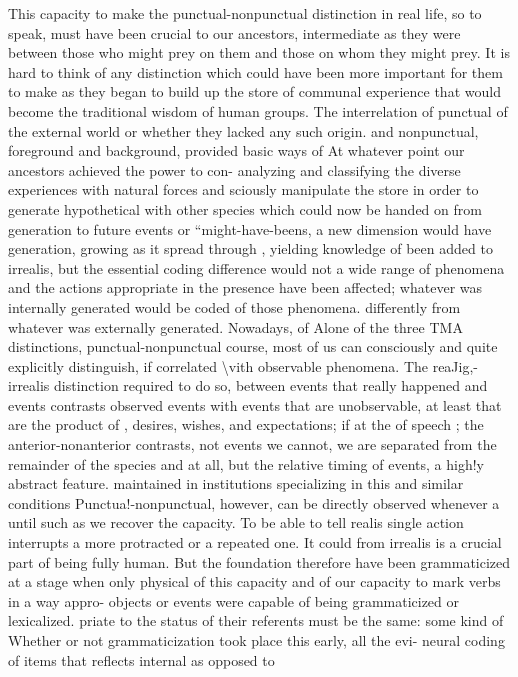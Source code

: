 This capacity to make the punctual-nonpunctual distinction in real life, so to speak, must have been crucial to our ancestors, inter\-mediate as they were between those who might prey on them and those on whom they might prey. It is hard to think of any distinction
which could have been more important for them to make as they began to build up the store of communal experience that would become
the traditional wisdom of human groups. The interrelation of punctual of the external world or whether they lacked any such origin.
and nonpunctual, foreground and background, provided basic ways of At whatever point our ancestors achieved the power to con- analyzing and classifying the diverse experiences with natural forces and sciously manipulate the  store in order to generate hypothetical with other species which could now be handed on from generation to future events or ``might-have-beens, a new dimension would have generation, growing as it spread through , yielding knowledge of been added to irrealis, but the essential coding difference would not a wide range of phenomena and the actions appropriate in the presence have been affected; whatever was internally generated would be coded of those phenomena. differently from whatever was externally generated. Nowadays, of Alone of the three TMA distinctions, punctual-nonpunctual course, most of us can consciously and quite explicitly distinguish, if correlated {\textbackslash}vith observable phenomena. The reaJig,-irrealis distinction required to do so, between events that really happened and events contrasts observed events with events that are unobservable, at least that are the product of , desires, wishes, and expectations; if at the  of speech ; the anterior-nonanterior contrasts, not events we cannot, we are separated from the remainder of the species and at all, but the relative timing of events, a high!y abstract feature. maintained in institutions specializing in this and similar conditions Punctua!-nonpunctual, however, can be directly observed whenever a until such  as we recover the capacity. To be able to tell realis single action interrupts a more protracted or a repeated one. It could from irrealis is a crucial part of being fully human. But the foundation therefore have been grammaticized at a stage when only physical of this capacity and of our capacity to mark verbs in a way appro- objects or events were capable of being grammaticized or lexicalized. priate to the status of their referents must be the same: some kind of Whether or not grammaticization took place this early, all the evi- neural coding of  items that reflects internal as opposed to

